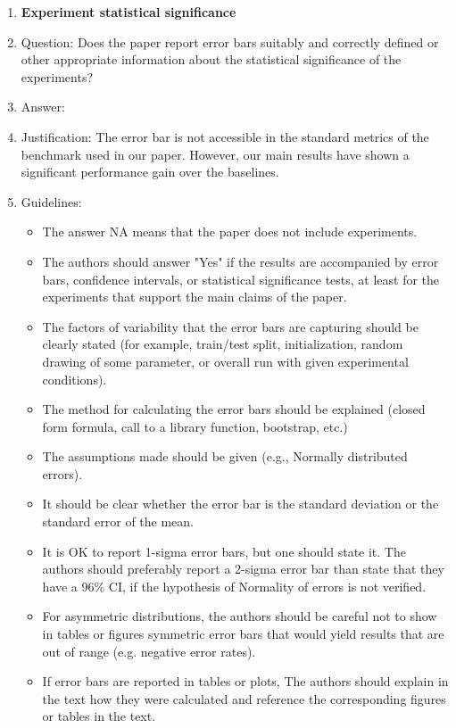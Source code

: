 \documentclass{article}
\begin{document}
\begin{enumerate}
\item {\bf Experiment statistical significance}
    \item[] Question: Does the paper report error bars suitably and correctly defined or other appropriate information about the statistical significance of the experiments?
    \item[] Answer: \answerNo{} %
    \item[] Justification: The error bar is not accessible in the standard metrics of the benchmark used in our paper. However, our main results have shown a significant performance gain over the baselines.
    \item[] Guidelines:
    \begin{itemize}
        \item The answer NA means that the paper does not include experiments.
        \item The authors should answer "Yes" if the results are accompanied by error bars, confidence intervals, or statistical significance tests, at least for the experiments that support the main claims of the paper.
        \item The factors of variability that the error bars are capturing should be clearly stated (for example, train/test split, initialization, random drawing of some parameter, or overall run with given experimental conditions).
        \item The method for calculating the error bars should be explained (closed form formula, call to a library function, bootstrap, etc.)
        \item The assumptions made should be given (e.g., Normally distributed errors).
        \item It should be clear whether the error bar is the standard deviation or the standard error of the mean.
        \item It is OK to report 1-sigma error bars, but one should state it. The authors should preferably report a 2-sigma error bar than state that they have a 96\% CI, if the hypothesis of Normality of errors is not verified.
        \item For asymmetric distributions, the authors should be careful not to show in tables or figures symmetric error bars that would yield results that are out of range (e.g. negative error rates).
        \item If error bars are reported in tables or plots, The authors should explain in the text how they were calculated and reference the corresponding figures or tables in the text.
    \end{itemize}


\end{enumerate}
\end{document}
